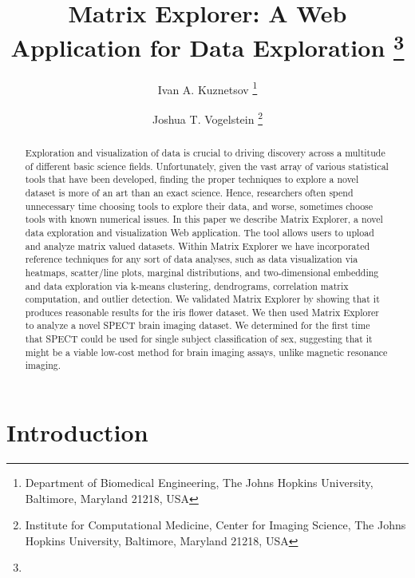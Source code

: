 \documentclass[twoside,leqno,twocolumn]{article}
\begin{document}
\title{Matrix Explorer: A Web Application for Data Exploration%
	\thanks{}
}


\author{Ivan A. Kuznetsov%
	\thanks{Department of Biomedical Engineering,  The Johns Hopkins University, Baltimore, Maryland 21218, USA}%
	\and
	Joshua T. Vogelstein%
	\footnotemark[2]
	\thanks{Institute for Computational Medicine, Center for Imaging Science, The Johns Hopkins University, Baltimore, Maryland 21218, USA}
}
\date{}
\maketitle

\begin{abstract}\small\baselineskip=9pt
Exploration and visualization of data is crucial to driving discovery across a multitude of different basic science fields. Unfortunately, given the vast array of various statistical tools that have been developed, finding the proper techniques to explore a novel dataset is more of an art than an exact science. Hence, researchers often spend unnecessary time choosing tools to explore their data, and worse, sometimes choose tools with known numerical issues.  In this paper we describe Matrix Explorer, a novel data exploration and visualization Web application. The tool allows users to upload and analyze matrix valued datasets. Within Matrix Explorer we have incorporated reference techniques for any sort of data analyses, such as data visualization via heatmaps, scatter/line plots, marginal distributions, and two-dimensional embedding and data exploration via k-means clustering, dendrograms, correlation matrix computation, and outlier detection. We validated Matrix Explorer by showing that it produces reasonable results for the iris flower dataset. We then used Matrix Explorer to analyze a novel SPECT brain imaging dataset. We determined for the first time that SPECT could be used for single subject classification of sex, suggesting that it might be a viable low-cost method for brain imaging assays, unlike magnetic resonance imaging.
\end{abstract}



\section{Introduction}
\label{sec:intro}
\end{document}
